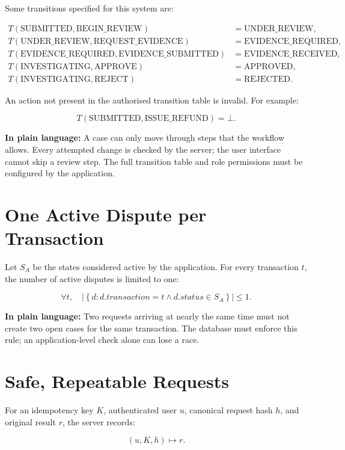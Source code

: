 \documentclass[11pt,a4paper]{article}
\begin{document}
Some transitions specified for this system are:

\begin{align*}
T(\text{SUBMITTED},\text{BEGIN\_REVIEW})
    &= \text{UNDER\_REVIEW},\\
T(\text{UNDER\_REVIEW},\text{REQUEST\_EVIDENCE})
    &= \text{EVIDENCE\_REQUIRED},\\
T(\text{EVIDENCE\_REQUIRED},\text{EVIDENCE\_SUBMITTED})
    &= \text{EVIDENCE\_RECEIVED},\\
T(\text{INVESTIGATING},\text{APPROVE})
    &= \text{APPROVED},\\
T(\text{INVESTIGATING},\text{REJECT})
    &= \text{REJECTED}.
\end{align*}

An action not present in the authorised transition table is invalid.
For example:

\[
T(\text{SUBMITTED},\text{ISSUE\_REFUND})=\bot.
\]

\textbf{In plain language:} A case can only move through steps that the
workflow allows. Every attempted change is checked by the server; the
user interface cannot skip a review step. The full transition table and
role permissions must be configured by the application.

\section{One Active Dispute per Transaction}

Let \(S_A\) be the states considered active by the application. For
every transaction \(t\), the number of active disputes is limited to
one:

\[
\forall t,\quad
\left|
\left\{
d : d.transaction=t\land d.status\in S_A
\right\}
\right|
\leq 1.
\]

\textbf{In plain language:} Two requests arriving at nearly the same
time must not create two open cases for the same transaction. The
database must enforce this rule; an application-level check alone can
lose a race.

\section{Safe, Repeatable Requests}

For an idempotency key \(K\), authenticated user \(u\), canonical
request hash \(h\), and original result \(r\), the server records:

\[
(u,K,h)\mapsto r.
\]
\end{document}

